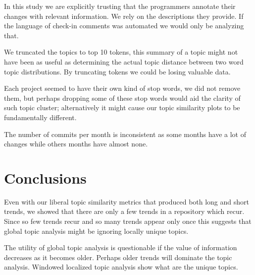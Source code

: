 \documentclass[times, 10pt,twocolumn]{article}
\begin{document}
In this study we are explicitly trusting that the programmers annotate
their changes with relevant information. We rely on the descriptions
they provide. If the language of check-in comments was automated we
would only be analyzing that.

We truncated the topics to top 10 tokens, this summary of a topic
might not have been as useful as determining the actual topic distance
between two word topic distributions. By truncating tokens we could be
losing valuable data.

Each project seemed to have their own kind of stop words, we did not
remove them, but perhaps dropping some of these stop words would aid
the clarity of such topic cluster; alternatively it might cause our
topic similarity plots to be fundamentally different. 

The number of
commits per month is inconsistent as some months have a lot of changes
while others months have almost none.





\section{Conclusions}








Even with our liberal topic similarity metrics that produced both
long and short trends, we showed that there are only a few trends in a
repository which recur. Since so few trends recur and so many
trends appear only once this suggests that global topic analysis might
be ignoring locally unique topics. 

The utility of global topic analysis is questionable if the value of
information decreases as it becomes older. Perhaps older trends will
dominate the topic analysis. Windowed localized topic analysis show
what are the unique topics.
\end{document}
